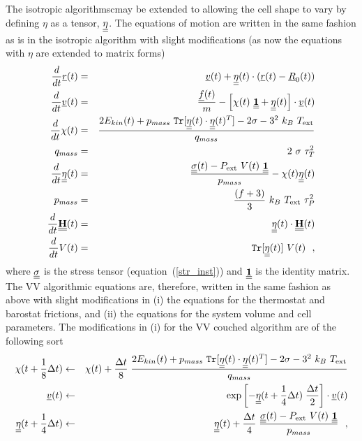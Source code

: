 The isotropic algorithmscmay be extended to allowing
the cell shape to vary by defining $\eta$ as a tensor, $\mbox{$\underline{\underline{\bf \eta}}$}$.
The equations of motion are written in the same fashion as is in the
isotropic algorithm with slight modifications (as now the equations
with $\eta$ are extended to matrix forms)
\begin{eqnarray}
\frac{d}{dt} \mbox{$\underline{r}$}(t) &=& \mbox{$\underline{v}$}(t) + \mbox{$\underline{\underline{\bf \eta}}$}(t) \cdot (\mbox{$\underline{r}$}(t) - \mbox{$\underline{R}$}_{0}(t)) \nonumber \\
\frac{d}{dt} \mbox{$\underline{v}$}(t) &=& \frac{\mbox{$\underline{f}$}(t)}{m} - \left[ \chi(t)~\mbox{$\underline{\underline{\bf 1}}$} +
\mbox{$\underline{\underline{\bf \eta}}$}(t) \right] \cdot \mbox{$\underline{v}$}(t) \nonumber \\
\frac{d}{dt} \chi(t) &=& \frac{2 E_{kin}(t) + p_{mass}~{\tt Tr}[\mbox{$\underline{\underline{\bf \eta}}$}(t) \cdot
\mbox{$\underline{\underline{\bf \eta}}$}(t)^{T}] - 2 \sigma - 3^{2}~k_{B}~T_{\rm ext}}{q_{mass}} \nonumber \\
q_{mass} &=& 2~\sigma~\tau_{T}^{2} \label{nsth} \\
\frac{d}{dt}\mbox{$\underline{\underline{\bf \eta}}$}(t) &=& \frac{\mbox{$\underline{\underline{\bf \sigma}}$}(t) -
P_{\rm ext}~V(t)~\mbox{$\underline{\underline{\bf 1}}$}}{p_{mass}} - \chi(t) \mbox{$\underline{\underline{\bf \eta}}$}(t) \nonumber \\
p_{mass} &=& \frac{(f+3)}{3}~k_{B}~T_{\rm ext}~\tau_{P}^{2} \nonumber \\
\frac{d}{dt}\mbox{$\underline{\underline{\bf H}}$}(t) &=& \mbox{$\underline{\underline{\bf \eta}}$}(t) \cdot \mbox{$\underline{\underline{\bf H}}$}(t) \nonumber \\
\frac{d}{dt} V(t) &=& {\tt Tr} [\mbox{$\underline{\underline{\bf \eta}}$}(t)]~V(t)~~, \nonumber
\end{eqnarray}
where $\mbox{$\underline{\underline{\bf \sigma}}$}$ is the stress tensor (equation~(\ref{str_inst})) and
$\mbox{$\underline{\underline{\bf 1}}$}$ is the identity matrix.  The VV algorithmic equations
are, therefore, written in the same fashion as above with slight
modifications in (i) the equations for the thermostat and barostat
frictions, and (ii) the equations for the system volume and cell
parameters.  The modifications in (i) for the VV couched algorithm
are of the following sort
\begin{eqnarray}
\chi (t + {1 \over 8} \Delta t) &\leftarrow& \chi (t) + {\Delta t \over 8} \;
{{2 E_{kin}(t) + p_{mass}~{\tt Tr}[\mbox{$\underline{\underline{\bf \eta}}$}(t) \cdot
\mbox{$\underline{\underline{\bf \eta}}$}(t)^{T}] - 2 \sigma - 3^{2}~k_{B}~T_{\rm ext}} \over q_{mass}} \nonumber \\
\mbox{$\underline{v}$}(t) &\leftarrow& \exp \left[ - \mbox{$\underline{\underline{\bf \eta}}$}(t + {1 \over 4}\Delta t) \;
{\Delta t \over 2} \right] \cdot \mbox{$\underline{v}$}(t) \\
\mbox{$\underline{\underline{\bf \eta}}$}(t + {1 \over 4} \Delta t) &\leftarrow& \mbox{$\underline{\underline{\bf \eta}}$}(t) +
{\Delta t \over 4} \; \frac{\mbox{$\underline{\underline{\bf \sigma}}$}(t) - P_{\rm ext}~V(t)~\mbox{$\underline{\underline{\bf 1}}$}}{p_{mass}}~~, \nonumber
\end{eqnarray}

